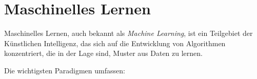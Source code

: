 \section{Maschinelles Lernen}

Maschinelles Lernen, auch bekannt als \textit{Machine Learning}, ist ein Teilgebiet der
Künstlichen Intelligenz, das sich auf die Entwicklung von Algorithmen konzentriert, die in der Lage sind, Muster aus
Daten zu lernen.

Die wichtigsten Paradigmen umfassen: 